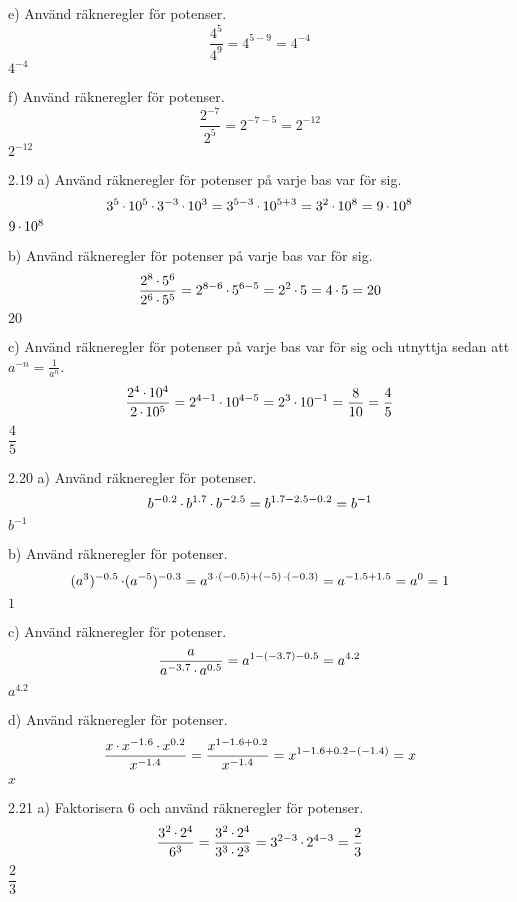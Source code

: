 \begin{task}{e)}
	Använd räkneregler för potenser.
	\[\dfrac{4^5}{4^9}=4^{5-9}=4^{-4}\]
	\ans $4^{-4}$
\end{task}

\begin{task}{f)}
	Använd räkneregler för potenser.
	\[\dfrac{2^{-7}}{2^5}=2^{-7-5}=2^{-12}\]
	\ans $2^{-12}$
\end{task}

\begin{task}{2.19 a)}
	Använd räkneregler för potenser på varje bas var för sig.
	\[3^5\operatorname{\cdot}10^5\operatorname{\cdot}3^{-3}\operatorname{\cdot}10^3=
	3^{5-3}\operatorname{\cdot}10^{5+3}=
	3^2\operatorname{\cdot}10^8=
	9\operatorname{\cdot}10^8\]
	\ans $9\operatorname{\cdot}10^8$
\end{task}

\begin{task}{b)}
	Använd räkneregler för potenser på varje bas var för sig.
	\[\dfrac{2^8\operatorname{\cdot}5^6}{2^6\operatorname{\cdot}5^5}=
	2^{8-6}\operatorname{\cdot}5^{6-5}=
	2^2\operatorname{\cdot}5=
	4\operatorname{\cdot}5=
	20\]
	\ans $20$
\end{task}

\begin{task}{c)}
	Använd räkneregler för potenser på varje bas var för sig och utnyttja sedan att $a^{-n}=\frac{1}{a^n}$.
	\[\dfrac{2^4\operatorname{\cdot}10^4}{2\operatorname{\cdot}10^5}=
	2^{4-1}\operatorname{\cdot}10^{4-5}=
	2^3\operatorname{\cdot}10^{-1}=
	\dfrac{8}{10}=
	\dfrac{4}{5}\]
	\ans $\dfrac{4}{5}$
\end{task}

\begin{task}{2.20 a)}
	Använd räkneregler för potenser.
	\[b^{-0.2}\operatorname{\cdot}b^{1.7}\operatorname{\cdot}b^{-2.5}=b^{1.7-2.5-0.2}=b^{-1}\]
	\ans $b^{-1}$
\end{task}

\begin{task}{b)}
	Använd räkneregler för potenser.
	\[(a^3)^{-0.5}\operatorname{\cdot}(a^{-5})^{-0.3}=
	a^{3\operatorname{\cdot}(-0.5)+(-5)\operatorname{\cdot}(-0.3)}=
	a^{-1.5+1.5}=
	a^0=
	1\]
	\ans $1$
\end{task}

\begin{task}{c)}
	Använd räkneregler för potenser.
	\[\dfrac{a}{a^{-3.7}\operatorname{\cdot}a^{0.5}}=a^{1-(-3.7)-0.5}=a^{4.2}\]
	\ans $a^{4.2}$
\end{task}

\begin{task}{d)}
	Använd räkneregler för potenser.
	\[\dfrac{x\operatorname{\cdot}x^{-1.6}\operatorname{\cdot}x^{0.2}}{x^{-1.4}}=
	\dfrac{x^{1-1.6+0.2}}{x^{-1.4}}=
	x^{1-1.6+0.2-(-1.4)}=
	x\]
	\ans $x$
\end{task}

\begin{task}{2.21 a)}
	Faktorisera $6$ och använd räkneregler för potenser.
	\[\dfrac{3^2\operatorname{\cdot}2^4}{6^3}=
	\dfrac{3^2\operatorname{\cdot}2^4}{3^3\operatorname{\cdot}2^3}=
	3^{2-3}\operatorname{\cdot}2^{4-3}=
	\dfrac{2}{3}\]
	\ans $\dfrac{2}{3}$
\end{task}

